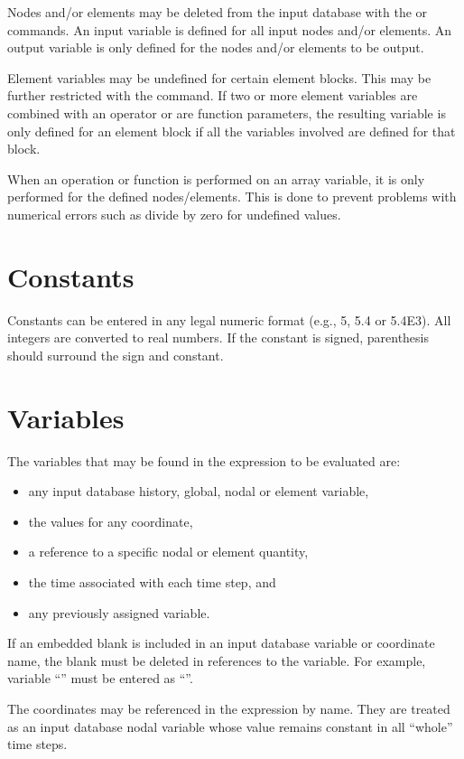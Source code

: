 Nodes and/or elements may be deleted from the input database with the
 or  commands. An input variable is defined for
all input nodes and/or elements. An output variable is only defined for
the nodes and/or elements to be output.

Element variables may be undefined for certain element blocks. This may
be further restricted with the  command. If two or more
element variables are combined with an operator or are function
parameters, the resulting variable is only defined for an element block
if all the variables involved are defined for that block.

When an operation or function is performed on an array variable, it is
only performed for the defined nodes/elements. This is done to prevent
problems with numerical errors such as divide by zero for undefined
values.

\section{Constants}

Constants can be entered in any legal  numeric format
(e.g., 5, 5.4 or 5.4E3). All integers are converted to real numbers. If
the constant is signed, parenthesis should surround the sign and
constant.

\section{Variables}

The variables that may be found in the expression to be evaluated are:
\setlength{\itemsep}{\smallskipamount} \begin{itemize}
\item any input database history, global, nodal or element variable,
\item the values for any coordinate,
\item a reference to a specific nodal or element quantity,
\item the time associated with each time step, and
\item any previously assigned variable.
\end{itemize}

If an embedded blank is included in an input database variable or
coordinate name, the blank must be deleted in references to the
variable. For example, variable ``'' must be entered as
``''.

The coordinates may be referenced in the expression by name. They are
treated as an input database nodal variable whose value remains constant
in all ``whole'' time steps.

